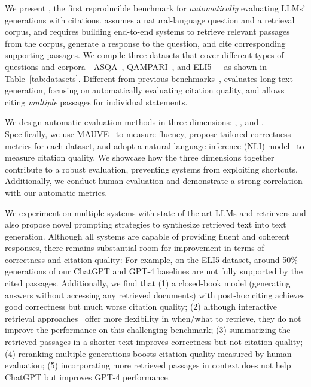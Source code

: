 We present \tf{\citeeval{}}, the first {reproducible} benchmark for \textit{automatically} evaluating LLMs'  generations with citations.
\citeeval{} assumes a natural-language question and a retrieval corpus, and requires building end-to-end systems to retrieve relevant passages from the corpus, generate a response to the question, and cite corresponding supporting passages.
We compile three datasets that cover different types of questions and corpora---ASQA~\cite{stelmakh2022asqa}, QAMPARI~\cite{rubin2022qampari}, and ELI5~\cite{fan-etal-2019-eli5}---as shown in Table~\ref{tab:datasets}.
Different from previous benchmarks~\citep{lee-etal-2019-latent,bohnet2022attributed},
\citeeval{} evaluates long-text generation, 
focusing on automatically evaluating citation quality,
and allows citing \textit{multiple} passages for individual statements.

We design automatic evaluation methods in three dimensions:
, , and .
Specifically,
we use MAUVE~\citep{pillutla2021mauve} to measure fluency, 
propose tailored correctness metrics for each dataset, %
and
adopt a natural language inference (NLI) model~\citep{honovich-etal-2022-true-evaluating} to measure citation quality.
We showcase how the three dimensions together contribute to a robust evaluation, 
preventing systems from exploiting shortcuts. %
Additionally, we conduct human evaluation and demonstrate a strong correlation with our automatic metrics.

We experiment on multiple systems with state-of-the-art LLMs and retrievers and also propose novel prompting strategies to synthesize retrieved text into text generation. 
Although all systems are capable of providing fluent and coherent responses, 
there remains substantial room for improvement in terms of correctness and citation quality: For example, on the ELI5 dataset, 
around 50\% generations of our ChatGPT and GPT-4 baselines are not fully supported by the cited passages. 
Additionally, we find that
(1) a closed-book model (generating answers without accessing any retrieved documents) with post-hoc citing achieves good correctness but much worse citation quality;
(2) although interactive retrieval approaches~\citep{yao2023react,schick2023toolformer} offer more flexibility in when/what to retrieve, they do not improve the performance on this challenging benchmark;
(3) summarizing the retrieved passages in a shorter text improves correctness but not citation quality;
(4) reranking multiple generations boosts citation quality measured by human evaluation;
(5) incorporating more retrieved passages in context does not help ChatGPT but improves GPT-4 performance.


